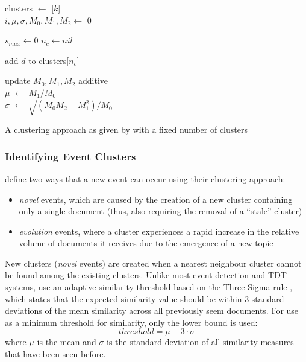 \begin{algorithm}
	\DontPrintSemicolon
	clusters $\gets$ [$k$] \\
	$i, \mu, \sigma, M_0, M_1, M_2 \gets$ 0 \\

	 {
		$s_{max} \gets 0$ 
		$n_{c} \gets nil$ 

		 {
			add $d$ to clusters[$n_c$]
		}

	update $M_0, M_1, M_2$ additive \\
	$\mu$ $\gets$ $M_1/M_0$ \\
	$\sigma$ $\gets$ $\sqrt{(M_0M_2 - M_1^2) / M_0}$

	}
	\caption{A clustering approach as given by \cite{Aggarwal12} with a fixed number of clusters}
	\label{background:alg:sbs}
\end{algorithm}

\subsubsection{Identifying Event Clusters}
\cite{Aggarwal12} define two ways that a new event can occur using their clustering approach:
\begin{itemize}
	\item \emph{novel} events, which are caused by the creation of a new cluster containing only a single document (thus, also requiring the removal of a ``stale'' cluster)
	\item \emph{evolution} events, where a cluster experiences a rapid increase in the relative volume of documents it receives due to the emergence of a new topic
\end{itemize}

New clusters (\emph{novel} events) are created when a nearest neighbour cluster cannot be found among the existing clusters.
Unlike most event detection and TDT systems, \cite{Aggarwal12} use an adaptive similarity threshold based on the Three Sigma rule \citep{Pukelsheim94}, which states that the expected similarity value should be within 3 standard deviations of the mean similarity across all previously seem documents.
For use as a minimum threshold for similarity, only the lower bound is used:
\begin{displaymath}
	threshold = \mu - 3 \cdot \sigma
\end{displaymath}
where $\mu$ is the mean and $\sigma$ is the standard deviation of all similarity measures that have been seen before.

